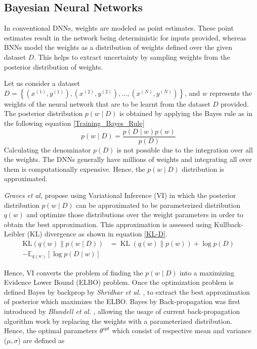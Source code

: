 \documentclass[10pt,twocolumn,letterpaper]{article}
\begin{document}
\subsection{Bayesian Neural Networks}
In conventional DNNs, weights are modeled as point estimates. These point estimates result in the network being deterministic for inputs provided, whereas BNNs model the weights as a distribution of weights defined over the given dataset $D$. This helps to extract uncertainty by sampling weights from the posterior distribution of weights.

Let us consider a dataset $D=\left\{\left(x^{(1)}, y^{(1)}\right),\left(x^{(2)}, y^{(2)}\right), \ldots,\left(x^{(N)}, y^{(N)}\right)\right\}$, and $w$ represents the weights of the neural network that are to be learnt from the dataset $D$ provided. The posterior distribution $p(w \mid D)$ is obtained by applying the Bayes rule as in the following equation \ref{Training_Bayes_Rule}
    \begin{equation}
        \label{Training_Bayes_Rule}
        p(w \mid D)=\frac{p(D \mid w) p(w)}{p(D)}
    \end{equation}
Calculating the denominator $p(D)$ is not possible due to the integration over all the weights. The DNNs generally have millions of weights and integrating all over them is computationally expensive. Hence, the $p(w \mid D)$ distribution is approximated.

\textit{Graves et al,} \cite{Graves2011} propose using Variational Inference (VI) in which the posterior distribution $p(w \mid D)$ can be approximated to be parameterized distribution $q(w)$ and optimize those distributions over the weight parameters in order to obtain the best approximation. This approximation is assessed using Kullback-Leibler (KL) divergence \cite{Kullback1959} as shown in equation \ref{KL-D}.
    \begin{equation}
        \label{KL-D}
        \begin{aligned}
            \mathrm{KL}(q(w) \| p(w \mid D)) &=\operatorname{KL}(q(w) \| p(w))+\log p(D)\\ -\mathbb{E}_{q(w)}[\log p(D \mid w)]
        \end{aligned}
    \end{equation}

Hence, VI converts the problem of finding the $p(w \mid D)$ into a maximizing Evidence Lower Bound (ELBO) problem. Once the optimization problem is defined Bayes by backprop by \textit{Shridhar et al.} \cite{shridhar2018uncertainty}, to extract the best approximation of posterior which maximizes the ELBO. Bayes by Back-propagation was first introduced by \textit{Blundell et al.} \cite{Blundell2015}, allowing the usage of current back-propagation algorithm work by replacing the weights with a parameterized distribution. Hence, the optimal parameters $\theta^{opt}$ which consist of respective mean and variance ($\mu, \sigma$) are defined as  
        
\end{document}
